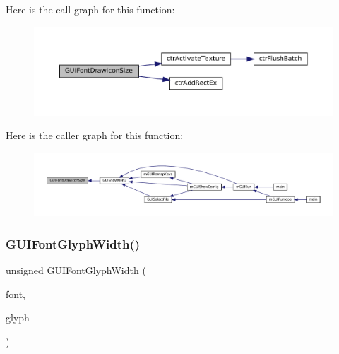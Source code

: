 Here is the call graph for this function\+:
\nopagebreak
\begin{figure}[H]
\begin{center}
\leavevmode
\includegraphics[width=350pt]{3ds_2gui-font_8c_ae9ac7ef646aad8e77b04baf500472178_cgraph}
\end{center}
\end{figure}
Here is the caller graph for this function\+:
\nopagebreak
\begin{figure}[H]
\begin{center}
\leavevmode
\includegraphics[width=350pt]{3ds_2gui-font_8c_ae9ac7ef646aad8e77b04baf500472178_icgraph}
\end{center}
\end{figure}
\mbox{\label{3ds_2gui-font_8c_a4b38c72440f93dd3f4c6d01848a23203}} 
\subsubsection{\texorpdfstring{G\+U\+I\+Font\+Glyph\+Width()}{GUIFontGlyphWidth()}}
{\footnotesize\ttfamily unsigned G\+U\+I\+Font\+Glyph\+Width (\begin{DoxyParamCaption}\item[{const struct G\+U\+I\+Font $\ast$}]{font,  }\item[{uint32\+\_\+t}]{glyph }\end{DoxyParamCaption})}

